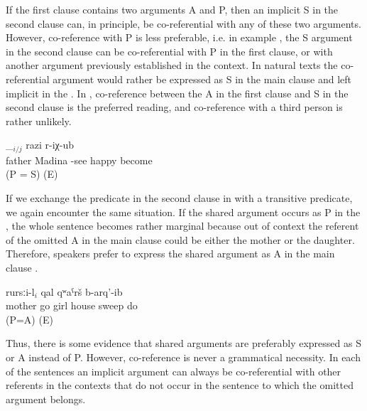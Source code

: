 If the first clause contains two arguments A and P, then an implicit S in the second clause can, in principle, be co-referential with any of these two arguments. However, co-reference with P is less preferable, i.e. in example , the S argument in the second clause can be co-referential with P in the first clause, or with another argument previously established in the context. In natural texts the co-referential argument would rather be expressed as S in the main clause and left implicit in the . In , co-reference between the A in the first clause and S in the second clause is the preferred reading, and co-reference with a third person is rather unlikely. 
%
\begin{exe}
	\ex	\label{ex:Father saw Madina and (she) got happy@40}
		\_$_{i/j}$	razi	r-iχ-ub\\
		father 	Madina	-see		happy	become\\
	\glt	{} (P = S) (E)
\end{exe}

If we exchange the predicate in the second clause in  with a transitive predicate, we again encounter the same situation. If the shared argument occurs as P in the , the whole sentence becomes rather marginal because out of context the referent of the omitted A in the main clause could be either the mother or the daughter. Therefore, speakers prefer to express the shared argument as A in the main clause .
%
 \begin{exe}
	\ex	\label{ex:Mother called her daughter and she swept the house@41}
	\gll	[aba-l	\_$_{i}$ až-aq-ur-re]	rursːi-l$_{i}$	qal	qʷaˁrš b-arq'-ib\\
		mother 	go	girl	house	sweep do\\
	\glt	{} (P=A) (E)
\end{exe}

Thus, there is some evidence that shared arguments are preferably expressed as S or A instead of P. However, co-reference is never a grammatical necessity. In each of the sentences an implicit argument can always be co-referential with other referents in the contexts that do not occur in the sentence to which the omitted argument belongs.

